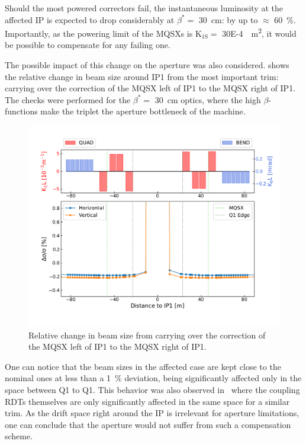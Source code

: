Should the most powered correctors fail, the instantaneous luminosity at the affected IP is expected to drop considerably at \(\beta^{\ast} =\) \qty{30}{\centi\meter}: by up to \(\approx\) \qty{60}{\percent}.
Importantly, as the powering limit of the MQSXs is \(\mathrm{K_{1S}} =\) \qty{30E-4}{\per\square\meter}, it would be possible to compensate for any failing one.

The possible impact of this change on the aperture was also considered.
 shows the relative change in beam size around IP\num{1} from the most important trim: carrying over the correction of the MQSX left of IP\num{1} to the MQSX right of IP\num{1}.
The checks were performed for the \(\beta^{\ast} =\) \qty{30}{\centi\meter} optics, where the high \(\beta\)-functions make the triplet the aperture bottleneck of the machine.

\begin{figure}[!htb]
    \centering
    \includegraphics*[width=\textwidth]{Figures/IR_Coupling_Correction/carry_over_to_ir1_right_beam_size_impact.pdf}
    \caption{Relative change in beam size from carrying over the correction of the MQSX left of IP\num{1} to the MQSX right of IP\num{1}.}
    \label{figure:carry_over_impact_on_beam_size}
\end{figure}

One can notice that the beam sizes in the affected case are kept close to the nominal ones at less than a \qty{1}{\percent} deviation, being significantly affected only in the space between Q\num{1} to Q\num{1}.
This behavior was also observed in~\cite{PRAB:Hofer:Coupling_Local_Observables} where the coupling RDTs themselves are only significantly affected in the same space for a similar trim.
As the drift space right around the IP is irrelevant for aperture limitations, one can conclude that the aperture would not suffer from such a compensation scheme.

